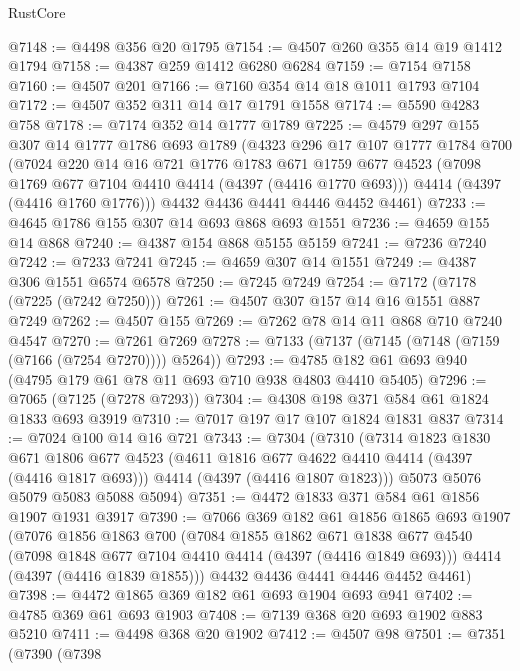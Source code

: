 \begin{lexlean}{RustCore}
\begin{coremodule}
@7148 := @4498 @356 @20 @1795
@7154 := @4507 @260 @355 @14 @19 @1412 @1794
@7158 := @4387 @259 @1412 @6280 @6284
@7159 := @7154 @7158
@7160 := @4507 @201
@7166 := @7160 @354 @14 @18 @1011 @1793 @7104
@7172 := @4507 @352 @311 @14 @17 @1791 @1558
@7174 := @5590 @4283 @758
@7178 := @7174 @352 @14 @1777 @1789
@7225 := @4579
    @297
    @155
    @307
    @14
    @1777
    @1786
    @693
    @1789
    (@4323
      @296
      @17
      @107
      @1777
      @1784
      @700
      (@7024
        @220
        @14
        @16
        @721
        @1776
        @1783
        @671
        @1759
        @677
        @4523
        (@7098 @1769 @677 @7104 @4410 @4414 (@4397 (@4416 @1770 @693)))
        @4414
        (@4397 (@4416 @1760 @1776)))
      @4432
      @4436
      @4441
      @4446
      @4452
      @4461)
@7233 := @4645 @1786 @155 @307 @14 @693 @868 @693 @1551
@7236 := @4659 @155 @14 @868
@7240 := @4387 @154 @868 @5155 @5159
@7241 := @7236 @7240
@7242 := @7233 @7241
@7245 := @4659 @307 @14 @1551
@7249 := @4387 @306 @1551 @6574 @6578
@7250 := @7245 @7249
@7254 := @7172 (@7178 (@7225 (@7242 @7250)))
@7261 := @4507 @307 @157 @14 @16 @1551 @887 @7249
@7262 := @4507 @155
@7269 := @7262 @78 @14 @11 @868 @710 @7240 @4547
@7270 := @7261 @7269
@7278 := @7133 (@7137 (@7145 (@7148 (@7159 (@7166 (@7254 @7270)))) @5264))
@7293 := @4785 @182 @61 @693 @940 (@4795 @179 @61 @78 @11 @693 @710 @938 @4803 @4410 @5405)
@7296 := @7065 (@7125 (@7278 @7293))
@7304 := @4308 @198 @371 @584 @61 @1824 @1833 @693 @3919
@7310 := @7017 @197 @17 @107 @1824 @1831 @837
@7314 := @7024 @100 @14 @16 @721
@7343 := @7304
    (@7310
      (@7314
        @1823
        @1830
        @671
        @1806
        @677
        @4523
        (@4611 @1816 @677 @4622 @4410 @4414 (@4397 (@4416 @1817 @693)))
        @4414
        (@4397 (@4416 @1807 @1823)))
      @5073
      @5076
      @5079
      @5083
      @5088
      @5094)
@7351 := @4472 @1833 @371 @584 @61 @1856 @1907 @1931 @3917
@7390 := @7066
    @369
    @182
    @61
    @1856
    @1865
    @693
    @1907
    (@7076
      @1856
      @1863
      @700
      (@7084
        @1855
        @1862
        @671
        @1838
        @677
        @4540
        (@7098 @1848 @677 @7104 @4410 @4414 (@4397 (@4416 @1849 @693)))
        @4414
        (@4397 (@4416 @1839 @1855)))
      @4432
      @4436
      @4441
      @4446
      @4452
      @4461)
@7398 := @4472 @1865 @369 @182 @61 @693 @1904 @693 @941
@7402 := @4785 @369 @61 @693 @1903
@7408 := @7139 @368 @20 @693 @1902 @883 @5210
@7411 := @4498 @368 @20 @1902
@7412 := @4507 @98
@7501 := @7351
    (@7390
      (@7398

\end{coremodule}
\end{lexlean}
